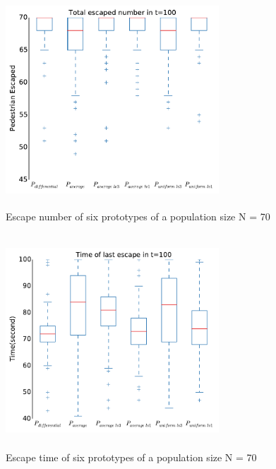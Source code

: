 \documentclass[a4paper,11pt,phdthesis,singlespace,twoside]{cssethesis}
\begin{document}
\begin{itemize}
\begin{figure}[H]
\begin{center}
\includegraphics[width=8cm,height=8cm]{figs/escape_number_analysis.pdf}
\end{center}
\caption{Escape number of six prototypes of a population size N = 70}
\label{fig:escape_num_dist}
\end{figure}

\begin{figure}[H]
\begin{center}
\includegraphics[width=8cm,height=8cm]{figs/escape_time_analysis.pdf}
\end{center}
\caption{Escape time of six prototypes of a population size N = 70}
\label{fig:escape_time_dist}
\end{figure}


\end{itemize}
\end{document}
